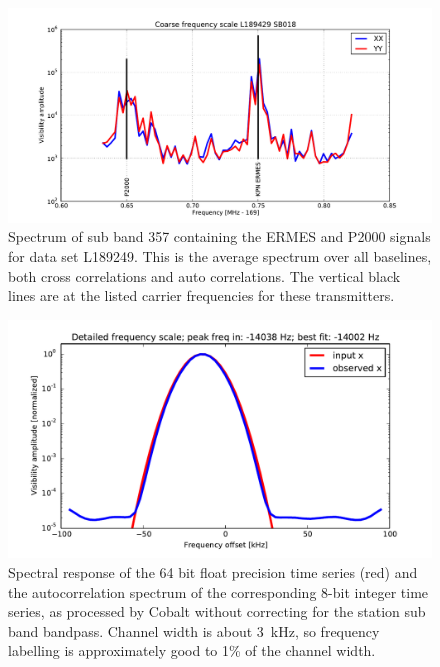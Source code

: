 \documentclass[a4paper,twoside, 10pt]{report}
\newcommand{\cobalt}{Cobalt\xspace}
\begin{document}
\begin{figure}
\begin{center}
\includegraphics[width=\columnwidth]{L189429-SB018-spectrum.pdf}
\end{center}
\caption{Spectrum of sub band 357 containing the ERMES and P2000
 signals for data set L189249. This is the average spectrum over all
 baselines, both cross correlations and auto correlations. The
 vertical black lines are at the listed carrier frequencies for these
 transmitters.}
\label{fig:frequencies-of-P2000-and-ERMES}
\end{figure}





\begin{figure}
\begin{center}
\includegraphics[width=\columnwidth]{cobalt-detailed-frequency-verification.pdf}
\end{center}
\caption{Spectral response of the 64 bit float precision time series
  (red) and the autocorrelation spectrum of the corresponding 8-bit
  integer time series, as processed by \cobalt without correcting for
  the station sub band bandpass. Channel width is about 3~kHz, so
  frequency labelling is approximately good to 1\% of the channel
  width.}
\label{fig:detailed-frequency-labels}
\end{figure}
\end{document}
